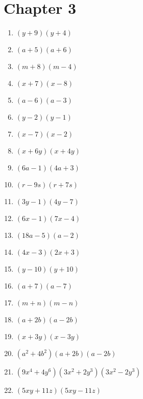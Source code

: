 \documentclass[a4paper]{JAC2003}
\begin{document}
\section{Chapter 3}
\begin{enumerate}
\item $(y+9)(y+4)$

\item $(a+5)(a+6)$

\item $(m+8)(m-4)$

\item $(x+7)(x-8)$

\item $(a-6)(a-3)$

\item $(y-2)(y-1)$

\item $(x-7)(x-2)$

\item $(x+6 y)(x+4 y)$

\item $(6 a-1)(4 a+3)$

\item $(r-9 s)(r+7 s)$

\item $(3 y-1)(4 y-7)$

\item $(6 x-1)(7 x-4)$

\item $(18 a-5)(a-2)$

\item $(4 x-3)(2 x+3)$

\item $(y-10)(y+10)$ %

\item $(a+7)(a-7)$

\item $(m+n)(m-n)$

\item $(a+2 b)(a-2 b)$

\item $(x+3 y)(x-3 y)$

\item $\left(a^{2}+4 b^{2}\right)(a+2 b)(a-2 b)$

\item $\left(9 x^{4}+4 y^{6}\right)\left(3 x^{2}+2 y^{3}\right)\left(3 x^{2}-2 y^{3}\right)$

\item $(5 x y+11 z)(5 x y-11 z)$


\end{enumerate}
\end{document}
